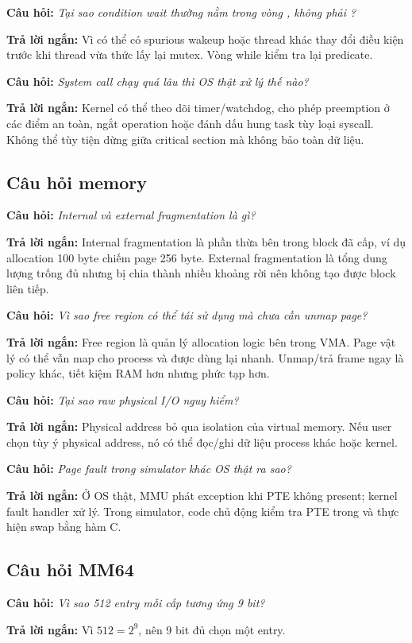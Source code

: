 \documentclass[12pt,a4paper]{article}
\newcommand{\code}[1]{\texttt{\detokenize{#1}}}
\newcommand{\question}[1]{\textbf{\color{bkgold}Câu hỏi:} \textit{#1}}
\newcommand{\answer}{\textbf{\color{bkblue}Trả lời ngắn:} }
\begin{document}
\question{Tại sao condition wait thường nằm trong vòng \code{while}, không
phải \code{if}?}

\answer Vì có thể có spurious wakeup hoặc thread khác thay đổi điều kiện trước
khi thread vừa thức lấy lại mutex. Vòng while kiểm tra lại predicate.

\question{System call chạy quá lâu thì OS thật xử lý thế nào?}

\answer Kernel có thể theo dõi timer/watchdog, cho phép preemption ở các điểm
an toàn, ngắt operation hoặc đánh dấu hung task tùy loại syscall. Không thể
tùy tiện dừng giữa critical section mà không bảo toàn dữ liệu.

\subsection{Câu hỏi memory}

\question{Internal và external fragmentation là gì?}

\answer Internal fragmentation là phần thừa bên trong block đã cấp, ví dụ
allocation 100 byte chiếm page 256 byte. External fragmentation là tổng dung
lượng trống đủ nhưng bị chia thành nhiều khoảng rời nên không tạo được block
liên tiếp.

\question{Vì sao free region có thể tái sử dụng mà chưa cần unmap page?}

\answer Free region là quản lý allocation logic bên trong VMA. Page vật lý có
thể vẫn map cho process và được dùng lại nhanh. Unmap/trả frame ngay là policy
khác, tiết kiệm RAM hơn nhưng phức tạp hơn.

\question{Tại sao raw physical I/O nguy hiểm?}

\answer Physical address bỏ qua isolation của virtual memory. Nếu user chọn
tùy ý physical address, nó có thể đọc/ghi dữ liệu process khác hoặc kernel.

\question{Page fault trong simulator khác OS thật ra sao?}

\answer Ở OS thật, MMU phát exception khi PTE không present; kernel fault
handler xử lý. Trong simulator, code chủ động kiểm tra PTE trong
\code{pg_getpage()} và thực hiện swap bằng hàm C.

\subsection{Câu hỏi MM64}

\question{Vì sao 512 entry mỗi cấp tương ứng 9 bit?}

\answer Vì \(512 = 2^9\), nên 9 bit đủ chọn một entry.
\end{document}
